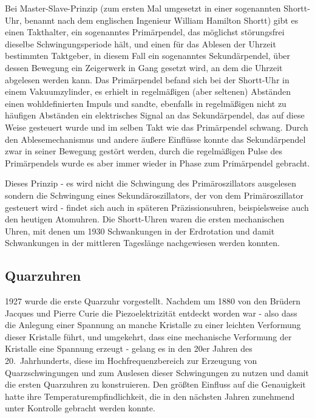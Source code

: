 Bei Master-Slave-Prinzip (zum ersten Mal umgesetzt in einer sogenannten 
Shortt-Uhr, benannt nach dem
englischen Ingenieur William Hamilton Shortt) gibt es einen
Takthalter, ein sogenanntes Prim\"arpendel, das m\"oglichst st\"orungsfrei dieselbe Schwingungsperiode h\"alt, und
einen f\"ur das Ablesen der Uhrzeit bestimmten Taktgeber, in diesem Fall ein sogenanntes Sekund\"arpendel, \"uber
dessen Bewegung ein Zeigerwerk in Gang gesetzt wird, an dem die Uhrzeit abgelesen werden kann. 
Das Prim\"arpendel befand sich bei der Shortt-Uhr in einem Vakuumzylinder, es erhielt in regelm\"a\ss igen
(aber seltenen) Abst\"anden einen wohldefinierten Impuls und sandte, ebenfalls in regelm\"a\ss igen nicht zu
h\"aufigen Abst\"anden ein elektrisches Signal an das Sekund\"arpendel, das auf diese Weise gesteuert wurde
und im selben Takt wie das Prim\"arpendel schwang. Durch den Ablesemechanismus und andere \"au\ss ere
Einfl\"usse konnte das Sekund\"arpendel zwar in seiner Bewegung gest\"ort werden, durch die regelm\"a\ss igen
Pulse des Prim\"arpendels wurde es aber immer wieder in Phase zum Prim\"arpendel gebracht. 

Dieses Prinzip - es wird nicht die Schwingung des Prim\"aroszillators ausgelesen sondern die Schwingung
eines Sekund\"aroszillators, der von dem Prim\"aroszillator gesteuert wird - findet sich auch in sp\"ateren 
Pr\"azissionsuhren, beispielsweise auch den heutigen Atomuhren. Die Shortt-Uhren waren die ersten
mechanischen Uhren, mit denen um 1930 Schwankungen in der Erdrotation und damit Schwankungen in der
mittleren Tagesl\"ange nachgewiesen werden konnten. 

\subsection{Quarzuhren}

1927 wurde die erste Quarzuhr 
vorgestellt. Nachdem um 1880 von den Br\"udern Jacques und
Pierre Curie die Piezoelektrizit\"at entdeckt worden war - also dass die Anlegung einer Spannung
an manche Kristalle zu einer leichten Verformung dieser Kristalle f\"uhrt, und umgekehrt, dass eine mechanische
Verformung der Kristalle eine Spannung erzeugt - gelang es in den 20er Jahren des 20.\ Jahrhunderts,
diese im Hochfrequenzbereich zur Erzeugung von Quarzschwingungen und zum Auslesen dieser
Schwingungen zu nutzen und damit die ersten Quarzuhren zu konstruieren. Den gr\"o\ss ten Einfluss
auf die Genauigkeit hatte ihre Temperaturempfindlichkeit, die in den n\"achsten Jahren zunehmend unter
Kontrolle gebracht werden konnte.  

